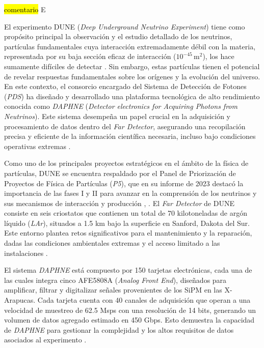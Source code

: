 
\hl{comentario}
E

El experimento DUNE (\textit{Deep Underground Neutrino Experiment}) tiene como propósito principal la observación y el estudio detallado de los neutrinos, partículas fundamentales cuya interacción extremadamente débil con la materia, representada por su baja sección eficaz de interacción ($10^{-45} \, \si{\meter^2}$), los hace sumamente difíciles de detectar \cite{Mishra1990}. Sin embargo, estas partículas tienen el potencial de revelar respuestas fundamentales sobre los orígenes y la evolución del universo. En este contexto, el consorcio encargado del Sistema de Detección de Fotones (\textit{PDS}) ha diseñado y desarrollado una plataforma tecnológica de alto rendimiento conocida como \textit{DAPHNE} (\textit{Detector electronics for Acquiring Photons from Neutrinos}). Este sistema desempeña un papel crucial en la adquisición y procesamiento de datos dentro del \textit{Far Detector}, asegurando una recopilación precisa y eficiente de la información científica necesaria, incluso bajo condiciones operativas extremas \cite{Abi2020}.


Como uno de los principales proyectos estratégicos en el ámbito de la física de partículas, DUNE se encuentra respaldado por el Panel de Priorización de Proyectos de Física de Partículas (\textit{P5}), que en su informe de 2023 destacó la importancia de las fases I y II para avanzar en la comprensión de los neutrinos y sus mecanismos de interacción y producción \cite{DUNE_Phase_II}, \cite{P5_Report}. El \textit{Far Detector} de DUNE consiste en seis criostatos que contienen un total de 70 kilotoneladas de argón líquido (\textit{LAr}), situados a 1.5 km bajo la superficie en Sanford, Dakota del Sur. Este entorno plantea retos significativos para el mantenimiento y la reparación, dadas las condiciones ambientales extremas y el acceso limitado a las instalaciones \cite{Abi2020}. 

El sistema \textit{DAPHNE} está compuesto por 150 tarjetas electrónicas, cada una de las cuales integra cinco AFE5808A (\textit{Analog Front End}), diseñados para amplificar, filtrar y digitalizar señales provenientes de los SiPM en las X-Arapucas. Cada tarjeta cuenta con 40 canales de adquisición que operan a una velocidad de muestreo de 62.5 Msps con una resolución de 14 bits, generando un volumen de datos agregado estimado en 450 Gbps. Esto demuestra la capacidad de \textit{DAPHNE} para gestionar la complejidad y los altos requisitos de datos asociados al experimento .

